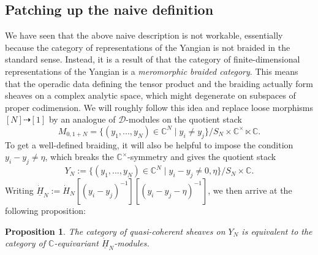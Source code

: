 \documentclass[11pt]{report}
\newtheorem{prop}[theorem]{Proposition}
\theoremstyle{definition}
\theoremstyle{remark}
\theoremstyle{remark}
\newcommand{\C}{\mathbb{C}}
\begin{document}
\subsection{Patching up the naive definition}

We have seen that the above naive description is not workable, essentially because the category of representations of the Yangian is not braided in the standard sense. Instead, it is a result of \cite{article:soibelman:1997} that the category of finite-dimensional representations of the Yangian is a \emph{meromorphic braided category}. This means that the operadic data defining the tensor product and the braiding actually form sheaves on a complex analytic space, which might degenerate on subspaces of proper codimension. We will roughly follow this idea and replace loose morphisms $[N] \dashrightarrow [1]$ by an analogue of $\mathcal{D}$-modules on the quotient stack
\begin{equation*}
M_{0,1+N} = \{ (y_1,...,y_N) \in \C^N \mid y_i \neq y_j \} / S_N \times \C^\times \ltimes \C.
\end{equation*}
To get a well-defined braiding, it will also be helpful to impose the condition $y_i-y_j \neq \eta$, which breaks the $\C^\times$-symmetry and gives the quotient stack
\begin{equation*}
Y_N := \{ (y_1,...,y_N) \in \C^N \mid y_i-y_j \neq 0,\eta \}/S_N \times \C.
\end{equation*}
Writing $\underline{\dot H}_N := \dot H_N[(y_i-y_j)^{-1}][(y_i-y_j-\eta)^{-1}]$, we then arrive at the following proposition:

\begin{prop}
The category of quasi-coherent sheaves on $Y_N$ is equivalent to the category of $\C$-equivariant $\underline{\dot H}_N$-modules.
\end{prop}
\end{document}
